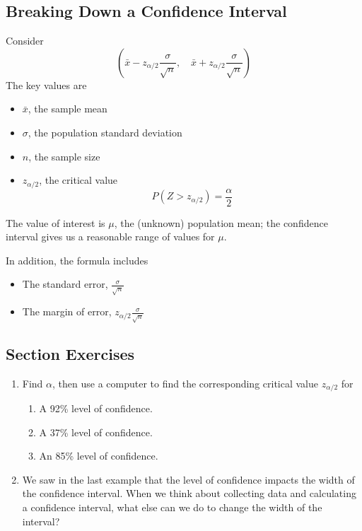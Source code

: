 \documentclass[
]{book}
\providecommand{\tightlist}{%
  \setlength{\itemsep}{0pt}\setlength{\parskip}{0pt}}
\begin{document}
\subsection{Breaking Down a Confidence Interval}\label{breaking-down-a-confidence-interval}

Consider \[\left(\bar{x}- z_{\alpha/2}\frac{\sigma}{\sqrt{n}}, \quad \bar{x} + z_{\alpha/2}\frac{\sigma}{\sqrt{n}}\right)\] The key values are

\begin{itemize}
\tightlist
\item
  \(\bar{x}\), the sample mean
\item
  \(\sigma\), the population standard deviation
\item
  \(n\), the sample size
\item
  \(z_{\alpha/2}\), the critical value \[P(Z > z_{\alpha/2}) = \frac{\alpha}{2}\]
\end{itemize}

The value of interest is \(\mu\), the (unknown) population mean; the confidence interval gives us a reasonable range of values for \(\mu\).

In addition, the formula includes

\begin{itemize}
\tightlist
\item
  The standard error, \(\frac{\sigma}{\sqrt{n}}\)
\item
  The margin of error, \(z_{\alpha/2}\frac{\sigma}{\sqrt{n}}\)
\end{itemize}

\subsection*{Section Exercises}\label{section-exercises-18}

\begin{enumerate}
\def\labelenumi{\arabic{enumi}.}
\tightlist
\item
  Find \(\alpha\), then use a computer to find the corresponding critical value \(z_{\alpha/2}\) for

  \begin{enumerate}
  \def\labelenumii{\alph{enumii}.}
  \tightlist
  \item
    A 92\% level of confidence.
  \item
    A 37\% level of confidence.
  \item
    An 85\% level of confidence.
  \end{enumerate}
\item
  We saw in the last example that the level of confidence impacts the width of the confidence interval. When we think about collecting data and calculating a confidence interval, what else can we do to change the width of the interval?
\end{enumerate}
\end{document}
